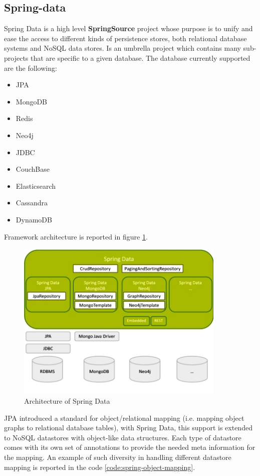\subsection{Spring-data}
Spring Data \cite{online:spring-data} is a high level \textbf{SpringSource} project whose purpose is to unify and ease the access to different kinds of persistence stores, both relational database systems and NoSQL data stores. Is an umbrella project which contains many sub-projects that are specific to a given database. The database currently supported are the following:
\begin{itemize}
\item JPA
\item MongoDB
\item Redis
\item Neo4j
\item JDBC
\item CouchBase
\item Elasticsearch
\item Cassandra
\item DynamoDB
\end{itemize}

\noindent Framework architecture is reported in figure \ref{fig:spring-data-overview}.

\begin{figure}[tbh]
  \centering
  \includegraphics[width=10cm]{images/spring_data_overview}
  \caption{Architecture of Spring Data \cite{online:spring-data-overview}}
  \label{fig:spring-data-overview}
\end{figure}

\noindent JPA introduced a standard for object/relational mapping (i.e. mapping object graphs to relational database tables), with Spring Data, this support is extended to NoSQL datastores with object-like data structures.
Each type of datastore comes with its own set of annotations to provide the needed meta information for the mapping. An example of such diversity in handling different datastore mapping is reported in the code \ref{code:spring-object-mapping}.

